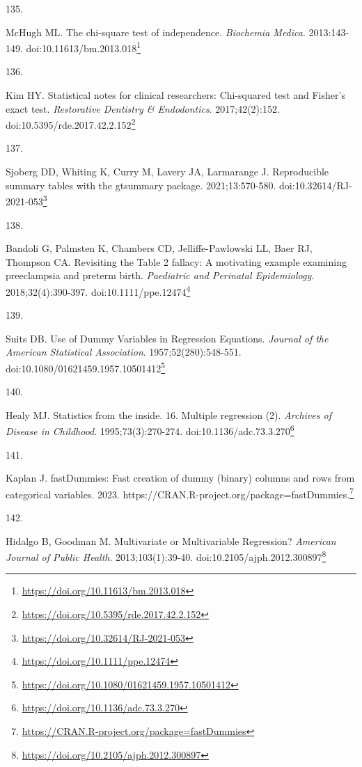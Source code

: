 \documentclass[
  a4paper,
]{book}
\newlength{\cslhangindent}
\newlength{\csllabelwidth}
\newlength{\cslentryspacingunit} %
\newenvironment{CSLReferences}[2] %
 {%
  \setlength{\parindent}{0pt}
  \ifodd #1
  \let\oldpar\par
  \def\par{\hangindent=\cslhangindent\oldpar}
  \fi
  \setlength{\parskip}{#2\cslentryspacingunit}
 }%
 {}
\newcommand{\CSLLeftMargin}[1]{\parbox[t]{\csllabelwidth}{#1}}
\newcommand{\CSLRightInline}[1]{\parbox[t]{\linewidth - \csllabelwidth}{#1}\break}
\renewcommand{\href}[2]{#2\footnote{\url{#1}}}
\begin{document}
\begin{CSLReferences}{0}{0}
\leavevmode{}%
\CSLLeftMargin{135. }%
\CSLRightInline{McHugh ML. The chi-square test of independence. \emph{Biochemia Medica}. 2013:143-149. doi:\href{https://doi.org/10.11613/bm.2013.018}{10.11613/bm.2013.018}}

\leavevmode{}%
\CSLLeftMargin{136. }%
\CSLRightInline{Kim HY. Statistical notes for clinical researchers: Chi-squared test and Fisher's exact test. \emph{Restorative Dentistry \& Endodontics}. 2017;42(2):152. doi:\href{https://doi.org/10.5395/rde.2017.42.2.152}{10.5395/rde.2017.42.2.152}}

\leavevmode{}%
\CSLLeftMargin{137. }%
\CSLRightInline{Sjoberg DD, Whiting K, Curry M, Lavery JA, Larmarange J. Reproducible summary tables with the gtsummary package. 2021;13:570-580. doi:\href{https://doi.org/10.32614/RJ-2021-053}{10.32614/RJ-2021-053}}

\leavevmode{}%
\CSLLeftMargin{138. }%
\CSLRightInline{Bandoli G, Palmsten K, Chambers CD, Jelliffe-Pawlowski LL, Baer RJ, Thompson CA. Revisiting the Table 2 fallacy: A motivating example examining preeclampsia and preterm birth. \emph{Paediatric and Perinatal Epidemiology}. 2018;32(4):390-397. doi:\href{https://doi.org/10.1111/ppe.12474}{10.1111/ppe.12474}}

\leavevmode{}%
\CSLLeftMargin{139. }%
\CSLRightInline{Suits DB. Use of Dummy Variables in Regression Equations. \emph{Journal of the American Statistical Association}. 1957;52(280):548-551. doi:\href{https://doi.org/10.1080/01621459.1957.10501412}{10.1080/01621459.1957.10501412}}

\leavevmode{}%
\CSLLeftMargin{140. }%
\CSLRightInline{Healy MJ. Statistics from the inside. 16. Multiple regression (2). \emph{Archives of Disease in Childhood}. 1995;73(3):270-274. doi:\href{https://doi.org/10.1136/adc.73.3.270}{10.1136/adc.73.3.270}}

\leavevmode{}%
\CSLLeftMargin{141. }%
\CSLRightInline{Kaplan J. fastDummies: Fast creation of dummy (binary) columns and rows from categorical variables. 2023. \href{https://CRAN.R-project.org/package=fastDummies}{https://CRAN.R-project.org/package=fastDummies.}}

\leavevmode{}%
\CSLLeftMargin{142. }%
\CSLRightInline{Hidalgo B, Goodman M. Multivariate or Multivariable Regression? \emph{American Journal of Public Health}. 2013;103(1):39-40. doi:\href{https://doi.org/10.2105/ajph.2012.300897}{10.2105/ajph.2012.300897}}


\end{CSLReferences}
\end{document}
